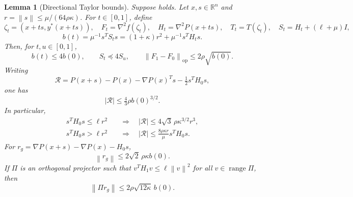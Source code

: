 \documentclass[11pt]{article}
\numberwithin{equation}{section}
\newtheorem{lemma}[assumption]{Lemma}
\newcommand{\R}{\mathbb R}
\newcommand{\norm}[1]{\left\lVert#1\right\rVert}
\newcommand{\op}{\mathrm{op}}
\DeclareMathOperator{\range}{range}
\begin{document}
\begin{lemma}[Directional Taylor bounds]\label{lem:directional}
Suppose  holds. Let $x,s\in\R^n$ and
$r=\norm s\le\mu/(64\rho\kappa)$. For $t\in[0,1]$, define
\[
 \zeta_t=(x+ts,y^*(x+ts)),\quad
 F_t=\nabla^2f(\zeta_t),\quad
 H_t=\nabla^2P(x+ts),\quad
 T_t=T(\zeta_t),\quad S_t=H_t+(\ell+\mu)I,
\]
\[
 b(t)=\mu^{-1}s^TS_ts
      =(1+\kappa)r^2+\mu^{-1}s^TH_ts.
\]
Then, for $t,u\in[0,1]$,
\begin{equation}\label{eq:path-comparisons}
 b(t)\le4b(0),\qquad S_t\preceq4S_u,
 \qquad\norm{F_1-F_0}_{\op}\le2\rho\sqrt{b(0)}.
\end{equation}
Writing
\[
 \mathcal R=P(x+s)-P(x)-\nabla P(x)^Ts-\tfrac12s^TH_0s,
\]
one has
\begin{equation}\label{eq:scalar-remainder}
 |\mathcal R|\le\tfrac43\rho b(0)^{3/2}.
\end{equation}
In particular,
\begin{align}
 s^TH_0s\le\ell r^2
 &\quad\Longrightarrow\quad
 |\mathcal R|\le4\sqrt3\,\rho\kappa^{3/2}r^3,
 \label{eq:low-curvature-remainder}\\
 s^TH_0s>\ell r^2
 &\quad\Longrightarrow\quad
 |\mathcal R|\le\frac{8\rho\kappa r}{\mu}s^TH_0s.
 \label{eq:high-curvature-remainder}
\end{align}
For $r_g=\nabla P(x+s)-\nabla P(x)-H_0s$,
\begin{equation}\label{eq:full-gradient-remainder}
 \norm{r_g}\le2\sqrt2\,\rho\kappa b(0).
\end{equation}
If $\Pi$ is an orthogonal projector such that
$v^TH_1v\le\ell\norm v^2$ for all $v\in\range\Pi$, then
\begin{equation}\label{eq:projected-gradient-remainder}
 \norm{\Pi r_g}\le2\rho\sqrt{12\kappa}\,b(0).
\end{equation}
\end{lemma}
\end{document}
